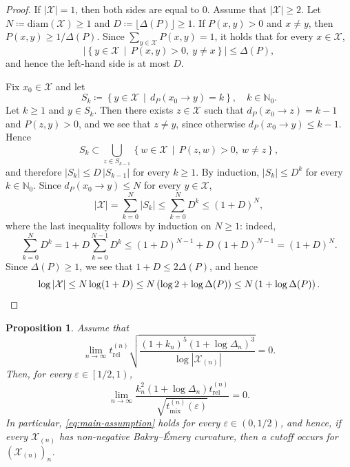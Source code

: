 \documentclass[a4paper, reqno, 11pt]{amsart}
\newtheorem{Prop}[Thm]{Proposition}
\theoremstyle{definition}
\begin{document}
\begin{proof}
If $|\mathcal{X}| = 1$, then both sides are equal to $0$.
Assume that $|\mathcal{X}| \ge 2$.
Let $N \coloneqq \mathrm{diam}(\mathcal{X}) \ge 1$ and $D \coloneqq \lfloor \Delta(P) \rfloor \ge 1$.
If $P(x,y) > 0$ and $x \ne y$, then $P(x,y) \ge 1/\Delta(P)$.
Since $\sum_{y \in \mathcal{X}} P(x,y) = 1$, it holds that for every $x \in \mathcal{X}$,
\[ \left|\left\{y \in \mathcal{X} \,\middle|\, P(x,y) > 0, \ y \ne x \right\}\right| \le \Delta(P), \]
and hence the left-hand side is at most $D$.

Fix $x_0 \in \mathcal{X}$ and let
\[ S_k \coloneqq \left\{y \in \mathcal{X} \,\middle|\, d_{P}(x_0 \to y) = k \right\}, \quad k \in \mathbb{N}_0. \]
Let $k \ge 1$ and $y \in S_k$.
Then there exists $z \in \mathcal{X}$ such that $d_{P}(x_0 \to z) = k-1$ and $P(z,y) > 0$,
and we see that $z \ne y$, since otherwise $d_{P}(x_0 \to y) \le k-1$.
Hence
\[ S_k \subset \bigcup_{z \in S_{k-1}} \left\{w \in \mathcal{X} \,\middle|\, P(z,w) > 0, \ w \ne z \right\}, \]
and therefore $|S_k| \le D\,|S_{k-1}|$ for every $k \ge 1$.
By induction, $|S_k| \le D^{k}$ for every $k \in \mathbb{N}_0$.
Since $d_{P}(x_0 \to y) \le N$ for every $y \in \mathcal{X}$,
\[ |\mathcal{X}| = \sum_{k=0}^{N} |S_k| \le \sum_{k=0}^{N} D^{k} \le (1+D)^{N}, \]
where the last inequality follows by induction on $N \ge 1$: indeed,
\[ \sum_{k=0}^{N} D^{k} = 1 + D \sum_{k=0}^{N-1} D^{k} \le (1+D)^{N-1} + D\,(1+D)^{N-1} = (1+D)^{N}. \]
Since $\Delta(P) \ge 1$, we see that $1 + D \le 2\Delta(P)$, and hence
\[ \log |\mathcal{X}| \le N \log(1+D) \le N \left(\log 2 + \log \Delta(P)\right) \le N \left(1 + \log \Delta(P)\right). \qedhere \]
\end{proof}

\begin{Prop}\label{prop:sufficient}
Assume that
\begin{equation}\label{eq:suff}
\lim_{n \to \infty} t_{\mathrm{rel}}^{(n)} \sqrt{\frac{(1+k_n)^{5}\left(1+\log \Delta_n\right)^{3}}{\log |\mathcal{X}_{(n)}|}} = 0.
\end{equation}
Then, for every $\varepsilon \in \left[1/2, 1\right)$,
\begin{equation}\label{eq:suff-2} 
\lim_{n \to \infty} \frac{k_n^{2}\left(1+\log \Delta_n\right) t_{\mathrm{rel}}^{(n)}}{\sqrt{t_{\mathrm{mix}}^{(n)}(\varepsilon)}} = 0. 
\end{equation}
In particular, \eqref{eq:main-assumption} holds for every $\varepsilon \in \left(0,1/2\right)$, and hence,
if every $\mathcal{X}_{(n)}$ has non-negative Bakry--\'Emery curvature,
then a cutoff occurs for $\left(\mathcal{X}_{(n)}\right)_n$.
\end{Prop}
\end{document}
